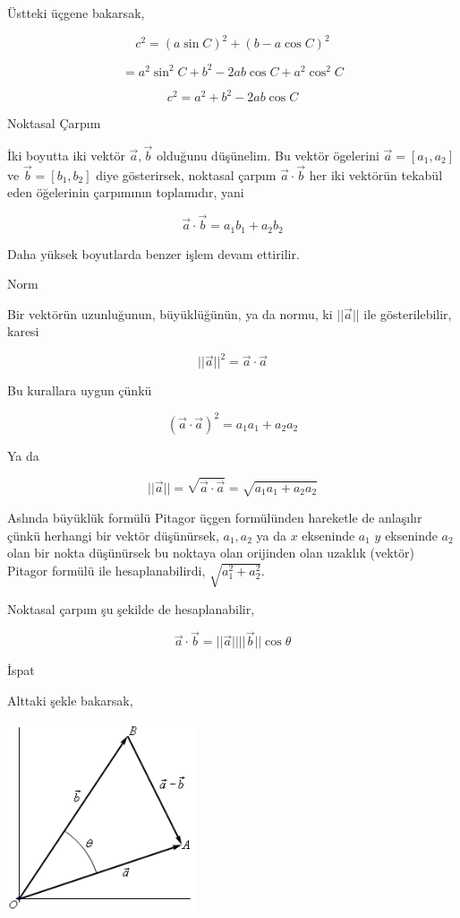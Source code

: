 \documentclass[12pt,fleqn]{article}\usepackage{../../common}
\begin{document}
Üstteki üçgene bakarsak,

$$
c^2 = (a \sin C)^2 + (b-a\cos C)^2
$$

$$
= a^2 \sin^2 C + b^2 - 2 a b \cos C + a^2 \cos^2 C
$$

$$
c^2 = a^2 + b^2 - 2 a b \cos C
$$

Noktasal Çarpım

İki boyutta iki vektör $\vec{a},\vec{b}$ olduğunu düşünelim. Bu vektör ögelerini
$\vec{a} = [a_1, a_2]$ ve $\vec{b} = [b_1, b_2]$ diye gösterirsek, noktasal
çarpım $\vec{a} \cdot \vec{b}$ her iki vektörün tekabül eden öğelerinin
çarpımının toplamıdır, yani

$$
\vec{a} \cdot \vec{b} = a_1 b_1 + a_2 b_2
$$

Daha yüksek boyutlarda benzer işlem devam ettirilir. 

Norm

Bir vektörün uzunluğunun, büyüklüğünün, ya da normu, ki $||\vec{a}||$ ile
gösterilebilir, karesi

$$
||\vec{a}||^2 = \vec{a} \cdot \vec{a} 
$$

Bu kurallara uygun çünkü

$$
(\vec{a} \cdot \vec{a})^2 = a_1 a_1 + a_2 a_2
$$

Ya da

$$
||\vec{a}|| = \sqrt{\vec{a} \cdot \vec{a}} = \sqrt{a_1 a_1 + a_2 a_2}
$$

Aslında büyüklük formülü Pitagor üçgen formülünden hareketle de anlaşılır çünkü
herhangi bir vektör düşünürsek, $a_1,a_2$ ya da $x$ ekseninde $a_1$ $y$
ekseninde $a_2$ olan bir nokta düşünürsek bu noktaya olan orijinden olan uzaklık
(vektör) Pitagor formülü ile hesaplanabilirdi, $\sqrt{a_1^2 + a_2^2}$.

Noktasal çarpım şu şekilde de hesaplanabilir,

$$
\vec{a} \cdot \vec{b} = ||\vec{a}|| ||\vec{b}|| \cos\theta
$$

İspat

Alttaki şekle bakarsak,

\includegraphics[width=15em]{abcos.png}
\end{document}
